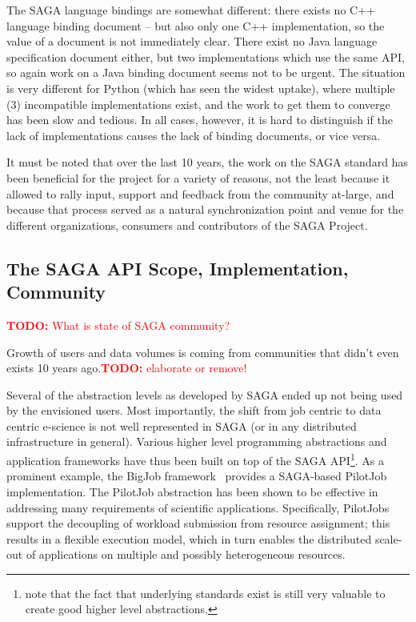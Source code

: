 \documentclass{article}
\newcommand{\B}[1]{\textbf{#1}}
\newcommand{\todo}[1]{{\textcolor{red}{\B{TODO:} #1 }}}
\newcommand{\todo}[1]{}
\begin{document}
  The SAGA language bindings are somewhat different: there exists no C++
  language binding document -- but also only one C++ implementation, so
  the value of a document is not immediately clear.  There exist no Java
  language specification document either, but two implementations which
  use the same API, so again work on a Java binding document seems not
  to be urgent.  The situation is very different for Python (which has
  seen the widest uptake), where multiple (3) incompatible
  implementations exist, and the work to get them to converge has been
  slow and tedious.  In all cases, however, it is hard to distinguish if
  the lack of implementations causes the lack of binding documents, or
  vice versa.
  
  It must be noted that over the last 10 years, the work on the SAGA
  standard has been beneficial for the project for a variety of reasons,
  not the least because it allowed to rally input, support and feedback
  from the community at-large, and because that process served as
  a natural synchronization point and venue for the different
  organizations, consumers and contributors of the SAGA Project.


 \subsection{The SAGA API Scope, Implementation, Community}

  \todo{What is state of SAGA community?}

  Growth of users and data volumes is coming from communities that
  didn't even exists 10 years ago.\todo{elaborate or remove!}
 
  Several of the abstraction levels as developed by SAGA ended up not
  being used by the envisioned users.  Most importantly, the shift from
  job centric to data centric e-science is not well represented in SAGA
  (or in any distributed infrastructure in general).  Various higher
  level programming abstractions and application frameworks have thus
  been built on top of the SAGA API\footnote{note that the fact that
  underlying standards exist is still very valuable to create good
  higher level abstractions.}.  As a prominent example, the BigJob
  framework~\cite{saga_bigjob_condor_cloud}  provides a SAGA-based
  PilotJob implementation. The PilotJob abstraction has been shown to be
  effective in addressing many requirements of scientific applications.
  Specifically, PilotJobs support the decoupling of workload submission
  from resource assignment; this results in a flexible execution model,
  which in turn enables the distributed scale-out of applications on
  multiple and possibly heterogeneous resources. %
\end{document}

